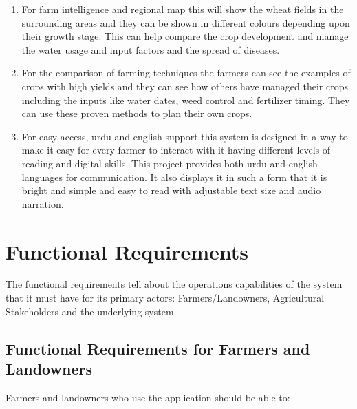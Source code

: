 \documentclass{FastFyp}
\begin{document}
\begin{enumerate}
    \item For farm intelligence and regional map this will show the wheat fields in the surrounding areas and they can be shown in different colours depending upon their growth stage. This can help compare the crop development and manage the water usage and input factors and the spread of diseases.

    \item For the comparison of farming techniques the farmers can see the examples of crops with high yields and they can see how others have managed their crops including the inputs like water dates, weed control and fertilizer timing. They can use these proven methods to plan their own crops.

    \item For easy access, urdu and english support this system is designed in a way to make it easy for every farmer to interact with it having different levels of reading and digital skills. This project provides both urdu and english languages for communication. It also displays it in such a form that it is bright and simple and easy to read with adjustable text size and audio narration.
\end{enumerate}

 



\section{Functional Requirements}
The functional requirements tell about the operations capabilities of the system that it must have for its primary actors: Farmers/Landowners, Agricultural Stakeholders and the underlying system. 

\subsection{Functional Requirements for Farmers and Landowners}
Farmers and landowners who use the application should be able to:
\end{document}
